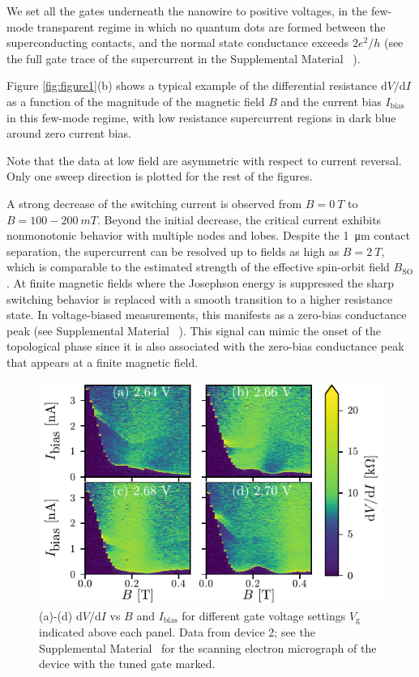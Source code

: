 We set all the gates underneath the nanowire to positive voltages, in the few-mode transparent regime in which no quantum dots are formed between the superconducting contacts, and the normal state conductance exceeds $2e^2/h$ (see the full gate trace of the supercurrent in the Supplemental Material ~\cite{supp}).

Figure \ref{fig:figure1}(b) shows a typical example of the differential resistance $\mathrm{d}V/\mathrm{d}I$ as a function of the magnitude of the magnetic field $B$ and the current bias $I_\mathrm{bias}$ in this few-mode regime, with low resistance supercurrent regions in dark blue around zero current bias. 

Note that the data at low field are asymmetric with respect to current reversal. Only one sweep direction is plotted for the rest of the figures.

A strong decrease of the switching current is observed from $B=\SI{0}{T}$ to $B=100-\SI{200}{mT}$. 
Beyond the initial decrease, the critical current exhibits nonmonotonic behavior with multiple nodes and lobes. 
Despite the \SI{1}{\micro \meter} contact separation, the supercurrent can be resolved up to fields as high as $B=\SI{2}{T}$, which is comparable to the estimated strength of the effective spin-orbit field $B_\mathrm{SO}$.
At finite magnetic fields where the Josephson energy is suppressed the sharp switching behavior is replaced with a smooth transition to a higher resistance state. 
In voltage-biased measurements, this manifests as a zero-bias conductance peak (see Supplemental Material ~\cite{supp}). 
This signal can mimic the onset of the topological phase since it is also associated with the zero-bias conductance peak that appears at a finite magnetic field.

\begin{figure}[t]
\includegraphics[width=\columnwidth]{chapter_supercurrent/figures/fig2.pdf}
\caption{(a)-(d) $\mathrm{d}V/\mathrm{d}I$ vs $B$ and $I_\mathrm{bias}$ for different gate voltage settings $V_\mathrm{g}$ indicated above each panel.  Data from device 2; see the Supplemental Material~\cite{supp} for the scanning electron micrograph of the device with the tuned gate marked.}
\label{fig:figure2}
\end{figure}

